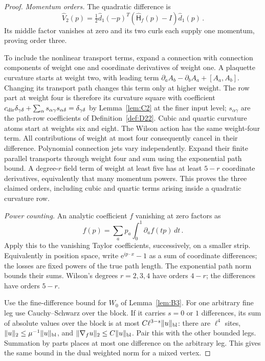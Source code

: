 \begin{proof}
\emph{Momentum orders.} The quadratic difference is
\begin{equation*}
\widehat V_2(p)=\tfrac12\widehat d_1(-p)^T(\widehat{\mathsf H}_f(p)-I)\widehat d_1(p)\,.
\end{equation*}
Its middle factor vanishes at zero and its two curls each supply one momentum, proving order three.

To include the nonlinear transport terms, expand a connection with connection components of weight one and coordinate derivatives of weight one. A plaquette curvature starts at weight two, with leading term $\partial_a A_b-\partial_b A_a+[A_a,A_b]$. Changing its transport path changes this term only at higher weight. The row part at weight four is therefore its curvature square with coefficient~$c_{\rm dir}\delta_{\gamma\delta}+\sum_\alpha s_{\alpha\gamma}s_{\alpha\delta}=\delta_{\gamma\delta}$ by Lemma~\ref{lem:C2} at the finer input level; $s_{\alpha\gamma}$ are the path-row coefficients of Definition~\ref{def:D22}. Cubic and quartic curvature atoms start at weights six and eight. The Wilson action has the same weight-four term. All contributions of weight at most four consequently cancel in their difference. Polynomial connection jets vary independently. Expand their finite parallel transports through weight four and sum using the exponential path bound. A degree-$r$ field term of weight at least five has at least $5-r$ coordinate derivatives, equivalently that many momentum powers. This proves the three claimed orders, including cubic and quartic terms arising inside a quadratic curvature row.

\emph{Power counting.} An analytic coefficient $f$ vanishing at zero factors as
\begin{equation*}
f(p)=\sum_ap_a\int_0^1\partial_af(tp)\,dt\,.
\end{equation*}
Apply this to the vanishing Taylor coefficients, successively, on a smaller strip. Equivalently in position space, write $\mathrm e^{ip\cdot x}-1$ as a sum of coordinate differences; the losses are fixed powers of the true path length. The exponential path norm bounds their sums. Wilson's degrees $r=2,3,4$ have orders $4-r$; the differences have orders $5-r$.

Use the fine-difference bound for $W_0$ of Lemma~\ref{lem:B3}. For one arbitrary fine leg use Cauchy--Schwarz over the block. If it carries $s=0$ or $1$ differences, its sum of absolute values over the block is at most $C\ell^{3-s}\|u\|_{\rm bl}$: there are $\ell^4$ sites, $\|u\|_2\le\mu^{-1}\|u\|_{\rm bl}$, and $\|\nabla_fu\|_2\le C\|u\|_{\rm bl}$. Pair this with the other bounded legs. Summation by parts places at most one difference on the arbitrary leg. This gives the same bound in the dual weighted norm for a mixed vertex.


\end{proof}
